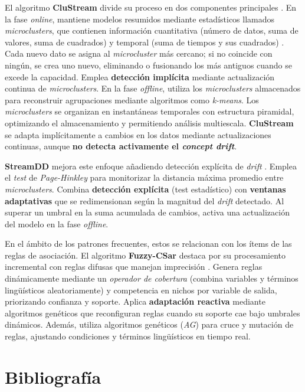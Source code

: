 \documentclass[12pt,letterpaper]{article}
\begin{document}
El algoritmo \textbf{CluStream} divide su proceso en dos componentes principales \cite{clustream}. En la fase \textit{online}, mantiene modelos resumidos mediante estadísticos llamados \textit{microclusters}, que contienen información cuantitativa (número de datos, suma de valores, suma de cuadrados) y temporal (suma de tiempos y sus cuadrados) \cite{clustream}. Cada nuevo dato se asigna al \textit{microcluster} más cercano; si no coincide con ningún, se crea uno nuevo, eliminando o fusionando los más antiguos cuando se excede la capacidad. Emplea \textbf{detección implícita} mediante actualización continua de \textit{microclusters}. En la fase \textit{offline}, utiliza los \textit{microclusters} almacenados para reconstruir agrupaciones mediante algoritmos como \textit{k-means}. Los \textit{microclusters} se organizan en instantáneas temporales con estructura piramidal, optimizando el almacenamiento y permitiendo análisis multiescala. \textbf{CluStream} se adapta implícitamente a cambios en los datos mediante actualizaciones continuas, aunque \textbf{no detecta activamente el \textit{concept drift}}.

\textbf{StreamDD} mejora este enfoque añadiendo detección explícita de \textit{drift} \cite{LEILA20241240}. Emplea el \textit{test} de \textit{Page-Hinkley} para monitorizar la distancia máxima promedio entre \textit{microclusters}. Combina \textbf{detección explícita} (test estadístico) con \textbf{ventanas adaptativas} que se redimensionan según la magnitud del \textit{drift} detectado. Al superar un umbral en la suma acumulada de cambios, activa una actualización del modelo en la fase \textit{offline}.

En el ámbito de los patrones frecuentes, estos se relacionan con los ítems de las reglas de asociación. El algoritmo \textbf{Fuzzy-CSar} destaca por su procesamiento incremental con reglas difusas que manejan imprecisión \cite{ORRIOLSPUIG20131332}. Genera reglas dinámicamente mediante un \textit{operador de cobertura} (combina variables y términos lingüísticos aleatoriamente) y competencia en nichos por variable de salida, priorizando confianza y soporte. Aplica \textbf{adaptación reactiva} mediante algoritmos genéticos que reconfiguran reglas cuando su soporte cae bajo umbrales dinámicos. Además, utiliza algoritmos genéticos (\textit{AG}) para cruce y mutación de reglas, ajustando condiciones y términos lingüísticos en tiempo real.

\newpage
\section{Bibliografía}

\printbibliography[heading=none, category=cited]
\end{document}
